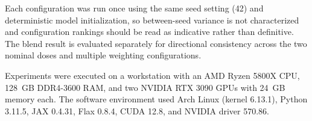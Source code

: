 Each configuration was run once using the same seed setting (42) and deterministic model initialization, so between-seed variance is not characterized and configuration rankings should be read as indicative rather than definitive. The blend result is evaluated separately for directional consistency across the two nominal doses and multiple weighting configurations.

Experiments were executed on a workstation with an AMD Ryzen 5800X CPU, 128~GB DDR4-3600 RAM, and two NVIDIA RTX 3090 GPUs with 24~GB memory each. The software environment used Arch Linux (kernel 6.13.1), Python 3.11.5, JAX 0.4.31, Flax 0.8.4, CUDA 12.8, and NVIDIA driver 570.86.
